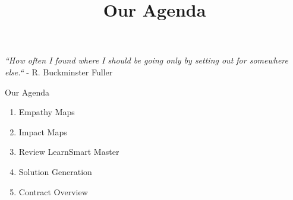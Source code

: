\documentclass{ximera}
\title{Our Agenda}
\begin{document}
\begin{abstract}

\end{abstract}
\maketitle

\emph{``How often I found where I should be going only by setting out for somewhere else.``} - R. Buckminster Fuller

Our Agenda
\begin{enumerate}
  \item Empathy Maps
  \item Impact Maps
  \item Review LearnSmart Master
  \item Solution Generation
  \item Contract Overview
\end{enumerate}
\end{document}

